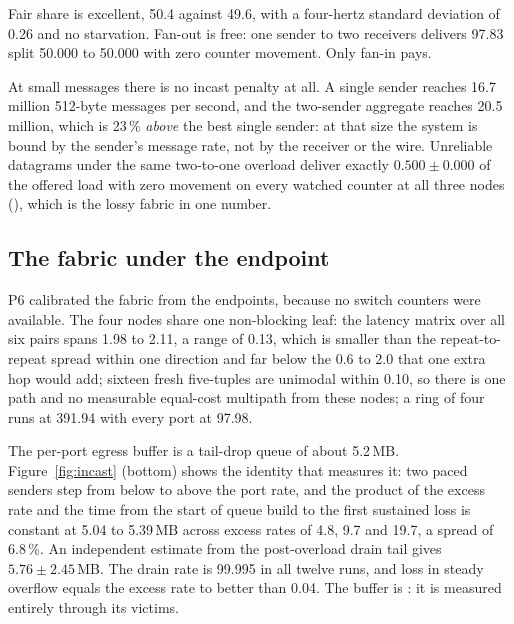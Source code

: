 Fair share is excellent, 50.4 against 49.6, with a four-hertz standard deviation of 0.26\Gbps{} and no
starvation. Fan-out is free: one sender to two receivers delivers 97.83\Gbps{}
split 50.000 to 50.000 with zero counter movement. Only fan-in pays.

At small messages there is no incast penalty at all. A single sender reaches
16.7 million 512-byte messages per second, and the two-sender aggregate reaches
20.5 million, which is 23\,\% \emph{above} the best single sender: at that size
the system is bound by the sender's message rate, not by the receiver or the
wire. Unreliable datagrams under the same two-to-one overload deliver exactly
$0.500 \pm 0.000$ of the offered load with zero movement on every watched
counter at all three nodes (), which is the lossy fabric in one
number.

\subsection{The fabric under the endpoint}
\label{sec:meas:fabric}

P6 calibrated the fabric from the endpoints, because no switch counters were
available. The four nodes share one non-blocking leaf: the latency matrix over
all six pairs spans 1.98 to 2.11\uS{}, a range of 0.13\uS{}, which is smaller
than the repeat-to-repeat spread within one direction and far below the
0.6 to 2.0\uS{} that one extra hop would add; sixteen fresh five-tuples are
unimodal within 0.10\uS{}, so there is one path and no measurable equal-cost
multipath from these nodes; a ring of four runs at 391.94\Gbps{} with every
port at 97.98\Gbps{}.

The per-port egress buffer is a tail-drop queue of about 5.2\,MB.
Figure~\ref{fig:incast} (bottom) shows the identity that measures it: two paced senders
step from below to above the port rate, and the product of the excess rate and
the time from the start of queue build to the first sustained loss is constant
at 5.04 to 5.39\,MB across excess rates of 4.8, 9.7 and 19.7\Gbps{}, a spread
of 6.8\,\%. An independent estimate from the post-overload drain tail gives
$5.76 \pm 2.45$\,MB. The drain rate is 99.995\Gbps{} in all twelve runs, and
loss in steady overflow equals the excess rate to better than 0.04\Gbps{}.
The buffer is \evinf{}: it is measured entirely through its victims.


